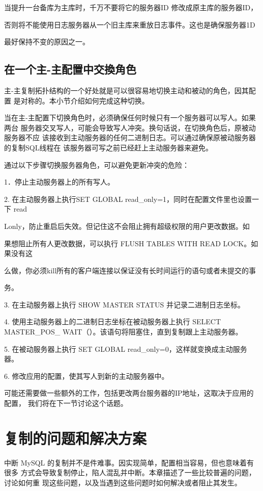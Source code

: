 当提升一台备库为主库时，千万不要将它的服务器ID 修改成原主库的服务器ID，

否则将不能使用日志服务器从一个旧主库来重放日志事件。这也是确保服务器1D

最好保持不变的原因之一。

\subsection{在一个主-主配置中交換角色}
主-主复制拓扑结构的一个好处就是可以很容易地切换主动和被动的角色，因其配置
是对称的。本小节介绍如何完成这种切换。

当在主-主配置下切换角色时，必须确保任何时候只有一个服务器可以写人。如果两台
服务器交叉写人，可能会导致写人冲突。换句话说，在切换角色后，原被动服务器不应
该接收到主动服务器的任何二进制日志。可以通过确保原被动服务器的复制SQL线程在
该服务器可写之前已经赶上主动服务器来避免。

通过以下步骤切换服务器角色，可以避免更新冲突的危险：

1．停止主动服务器上的所有写人。

2. 在主动服务器上执行SET GLOBAL read\_only=1，同时在配置文件里也设置一下
read

Lonly，防止重启后失效。但记住这不会阻止拥有超级权限的用户更改数据。如

果想阻止所有人更改数据，可以执行 FLUSH TABLES WITH READ LOCK。如果没有这

么做，你必须kill所有的客户端连接以保证没有长时间运行的语句或者未提交的事

务。

3. 在主动服务器上执行 SHOW MASTER STATUS 并记录二进制日志坐标。

4. 使用主动服务器上的二进制日志坐标在被动服务器上执行 SELECT MASTER\_POS\_
WAIT（）。该语句将阻塞住，直到复制跟上主动服务器。

5. 在被动服务器上执行 SET GLOBAL read\_only=0，这样就变换成主动服务器。

6. 修改应用的配置，使其写人到新的主动服务器中。

可能还需要做一些额外的工作，包括更改两台服务器的IP地址，这取决于应用的配置，
我们将在下一节讨论这个话题。

\section{复制的问题和解决方案}
中断 MySQL 的复制并不是件难事。因实现简单，配置相当容易，但也意味着有很多
方式会导致复制停止，陷人混乱并中断。本章描述了一些比较普遍的问题，讨论如何重
现这些问题，以及当遇到这些问题时如何解决或者阻止其发生。

